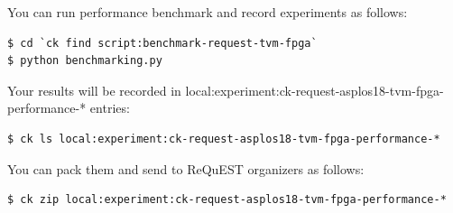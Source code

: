 \documentclass[sigconf]{acmart}
\begin{document}
You can run performance benchmark and record experiments as follows:

\begin{verbatim}
$ cd `ck find script:benchmark-request-tvm-fpga`
$ python benchmarking.py
\end{verbatim}

Your results will be recorded in local:experiment:ck-request-asplos18-tvm-fpga-performance-* entries:
\begin{verbatim}
$ ck ls local:experiment:ck-request-asplos18-tvm-fpga-performance-*
\end{verbatim}

You can pack them and send to ReQuEST organizers as follows:

\begin{verbatim}
$ ck zip local:experiment:ck-request-asplos18-tvm-fpga-performance-*
\end{verbatim}
\end{document}
